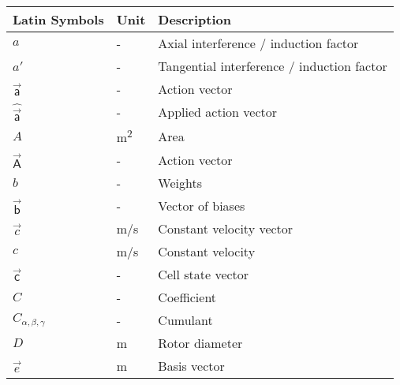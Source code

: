 \begin{longtable}{p{5cm}p{4cm}p{5cm}}
	Latin Symbols 			& Unit      	& Description      \\ \hline
	$a$						& \si{-}		& Axial interference / induction factor \\
	$a'$					& \si{-}		& Tangential interference / induction factor \\
	$\vec{\mathsf{a}}$		& \si{-}		& Action vector \\
	$\hat{\vec{\mathsf{a}}}$& \si{-}		& Applied action vector \\
	$A$						& \si{m\squared}	& Area \\
	$\vec{\mathsf{A}}$		& \si{-}		& Action vector \\
	$b$						& \si{-}		& Weights \\
	$\vec{\mathsf{b}}$		& \si{-}		& Vector of biases \\
    $\vec{c}$               & \si{m/s}    	& Constant velocity vector \\
    $c$                     & \si{m/s}    	& Constant velocity \\
   	$\vec{\mathsf{c}}$		& \si{-}		& Cell state vector \\
    $C$						& \si{-}		& Coefficient \\
    $C_{\alpha, \beta, \gamma}$& \si{-}		& Cumulant \\
    $D$						& \si{m}		& Rotor diameter \\
    $\vec{e}$				& \si{m}		& Basis vector \\

\end{longtable}
